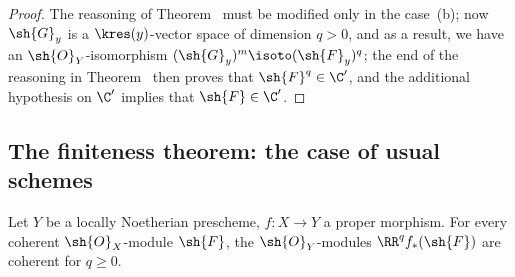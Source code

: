 \begin{proof}
The reasoning of Theorem~ must be modified only in the case~(b); now $\sh{G}_y$ is a $\kres(y)$-vector space of dimension $q>0$, and as a result, we have an $\sh{O}_Y$-isomorphism $(\sh{G}_y)^m\isoto(\sh{F}_y)^q$; the end of the reasoning in Theorem~ then proves that $\sh{F}^q\in\C'$, and the additional hypothesis on $\C'$ implies that $\sh{F}\in\C'$.
\end{proof}

\subsection{The finiteness theorem: the case of usual schemes}
\label{subsection:III.3.2}
\label{III.3.2}

\begin{theorem}[3.2.1]
\label{III.3.2.1}
Let $Y$ be a locally Noetherian prescheme, $f:X\to Y$ a proper morphism.
For every coherent $\sh{O}_X$-module $\sh{F}$, the $\sh{O}_Y$-modules $\RR^q f_*(\sh{F})$ are coherent for $q\geq 0$.
\end{theorem}

